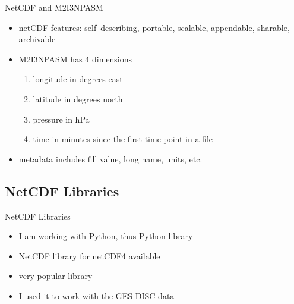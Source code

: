 \documentclass[../00_main.tex]{subfiles}
\begin{document}
\begin{frame}{NetCDF and M2I3NPASM}
    \begin{itemize}
        \item netCDF features: self--describing, portable, scalable, 
            appendable, sharable, archivable \cite{netcdf}
        \item M2I3NPASM has 4 dimensions \cite{merra2-files}
            \begin{enumerate}
                \item longitude in degrees east
                \item latitude in degrees north
                \item pressure in hPa
                \item time in minutes since the first time point in a file
            \end{enumerate}
        \item metadata includes fill value, long name, units, etc.
    \end{itemize}
\end{frame}

\subsection{NetCDF Libraries}

\begin{frame}{NetCDF Libraries}
    \begin{itemize}
        \item I am working with Python, thus Python library
        \item NetCDF library for netCDF4 available \cite{netcdf4}
        \item very popular library
        \item I used it to work with the GES DISC data
    \end{itemize}
\end{frame}
\end{document}
